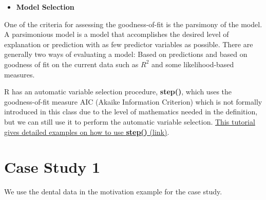 \documentclass[
]{book}
\providecommand{\tightlist}{%
  \setlength{\itemsep}{0pt}\setlength{\parskip}{0pt}}
\begin{document}
\begin{itemize}
\tightlist
\item
  \textbf{Model Selection}
\end{itemize}

One of the criteria for assessing the goodness-of-fit is the parsimony of the model. A parsimonious model is a model that accomplishes the desired level of explanation or prediction with as few predictor variables as possible. There are generally two ways of evaluating a model: Based on predictions and based on goodness of fit on the current data such as \(R^2\) and some likelihood-based measures.

R has an automatic variable selection procedure, \textbf{step()}, which uses the goodness-of-fit measure AIC (Akaike Information Criterion) which is not formally introduced in this class due to the level of mathematics needed in the definition, but we can still use it to perform the automatic variable selection. \href{http://rstudio-pubs-static.s3.amazonaws.com/2899_a9129debf6bd47d2a0501de9c0dc583d.html}{This tutorial gives detailed examples on how to use \textbf{step()} (link)}.

\hypertarget{case-study-1}{%
\section{Case Study 1}\label{case-study-1}}

We use the dental data in the motivation example for the case study.
\end{document}
